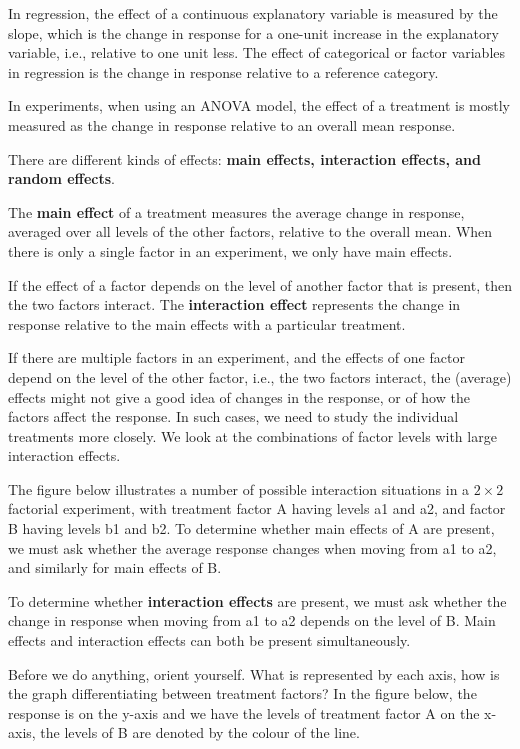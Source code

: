 \documentclass[
  letterpaper,
]{book}
\begin{document}
In regression, the effect of a continuous explanatory variable is
measured by the slope, which is the change in response for a one-unit
increase in the explanatory variable, i.e., relative to one unit less.
The effect of categorical or factor variables in regression is the
change in response relative to a reference category.

In experiments, when using an ANOVA model, the effect of a treatment is
mostly measured as the change in response relative to an overall mean
response.

There are different kinds of effects: \textbf{main effects, interaction
effects, and random effects}.

The \textbf{main effect} of a treatment measures the average change in
response, averaged over all levels of the other factors, relative to the
overall mean. When there is only a single factor in an experiment, we
only have main effects.

If the effect of a factor depends on the level of another factor that is
present, then the two factors interact. The \textbf{interaction effect}
represents the change in response relative to the main effects with a
particular treatment.

If there are multiple factors in an experiment, and the effects of one
factor depend on the level of the other factor, i.e., the two factors
interact, the (average) effects might not give a good idea of changes in
the response, or of how the factors affect the response. In such cases,
we need to study the individual treatments more closely. We look at the
combinations of factor levels with large interaction effects.

The figure below illustrates a number of possible interaction situations
in a \(2 \times 2\) factorial experiment, with treatment factor A having
levels a1 and a2, and factor B having levels b1 and b2. To determine
whether main effects of A are present, we must ask whether the average
response changes when moving from a1 to a2, and similarly for main
effects of B.

To determine whether \textbf{interaction effects} are present, we must
ask whether the change in response when moving from a1 to a2 depends on
the level of B. Main effects and interaction effects can both be present
simultaneously.

Before we do anything, orient yourself. What is represented by each
axis, how is the graph differentiating between treatment factors? In the
figure below, the response is on the y-axis and we have the levels of
treatment factor A on the x-axis, the levels of B are denoted by the
colour of the line.
\end{document}
